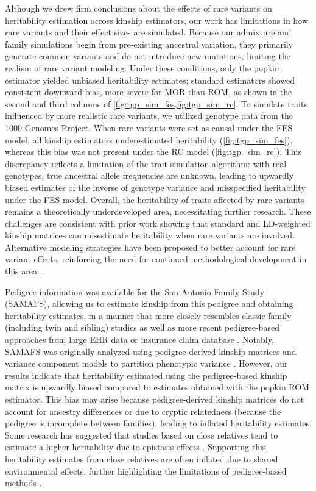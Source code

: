 \documentclass[11pt]{article}
\begin{document}
Although we drew firm conclusions about the effects of rare variants on heritability estimation across kinship estimators, our work has limitations in how rare variants and their effect sizes are simulated.
Because our admixture and family simulations begin from pre-existing ancestral variation, they primarily generate common variants and do not introduce new mutations, limiting the realism of rare variant modeling. 
Under these conditions, only the popkin estimator yielded unbiased heritability estimates; standard estimators showed consistent downward bias, more severe for MOR than ROM, as shown in the second and third columns of \cref{fig:tgp_sim_fes,fig:tgp_sim_rc}.
To simulate traits influenced by more realistic rare variants, we utilized genotype data from the 1000 Genomes Project. When rare variants were set as causal under the FES model, all kinship estimators underestimated heritability (\cref{fig:tgp_sim_fes}), whereas this bias was not present under the RC model (\cref{fig:tgp_sim_rc}). 
This discrepancy reflects a limitation of the trait simulation algorithm: with real genotypes, true ancestral allele frequencies are unknown, leading to upwardly biased estimates of the inverse of genotype variance and misspecified heritability under the FES model.
Overall, the heritability of traits affected by rare variants remains a theoretically underdeveloped area, necessitating further research. These challenges are consistent with prior work showing that standard and LD-weighted kinship matrices can misestimate heritability when rare variants are involved. Alternative modeling strategies have been proposed to better account for rare variant effects, reinforcing the need for continued methodological development in this area \citep{lee2013estimation,speed2017reevaluation}.

Pedigree information was available for the San Antonio Family Study (SAMAFS), allowing us to estimate kinship from this pedigree and obtaining heritability estimates, in a manner that more closely resembles classic family (including twin and sibling) studies \citep{almasy1998multipoint} as well as more recent pedigree-based approaches from large EHR data or insurance claim database \citep{polubriaginof2018disease,wang2017classification}. Notably, SAMAFS was originally analyzed using pedigree-derived kinship matrices and variance component models to partition phenotypic variance \citep{mitchell1996genetic}. However, our results indicate that heritability estimated using the pedigree-based kinship matrix is upwardly biased compared to estimates obtained with the popkin ROM estimator. This bias may arise because pedigree-derived kinship matrices do not account for ancestry differences or due to cryptic relatedness (because the pedigree is incomplete between families), leading to inflated heritability estimates. Some research has suggested that studies based on close relatives tend to estimate a higher heritability due to epistasis effects \citep{hemani2013evolutionary,young2014estimation}. 
Supporting this, heritability estimates from close relatives are often inflated due to shared environmental effects, further highlighting the limitations of pedigree-based methods \citep{zaitlen2013using}.
\end{document}
